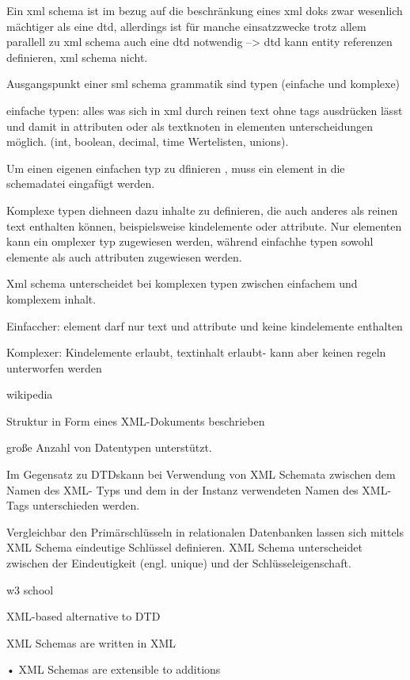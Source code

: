 Ein xml schema ist im bezug auf die beschränkung eines xml doks zwar wesenlich mächtiger als eine dtd, allerdings ist für manche einsatzzwecke trotz allem parallell zu xml schema auch eine dtd notwendig --> dtd kann entity referenzen definieren, xml schema nicht.

Ausgangspunkt einer sml schema grammatik sind typen (einfache und komplexe) 

einfache typen: alles was sich in xml durch reinen text ohne tags ausdrücken lässt und damit in attributen oder als textknoten in elementen unterscheidungen möglich. (int, boolean, decimal, time Wertelisten, unions).

Um einen eigenen einfachen typ zu dfinieren , muss ein element in die schemadatei eingafügt werden.

Komplexe typen diehneen dazu inhalte zu definieren, die auch anderes als reinen text enthalten können, beispielsweise kindelemente oder attribute. Nur elementen kann ein omplexer typ zugewiesen werden, während einfachhe typen sowohl elemente als auch attributen zugewiesen werden.

Xml schema unterscheidet bei komplexen typen zwischen einfachem und komplexem inhalt.

Einfaccher: element darf nur text und attribute und keine kindelemente enthalten

Komplexer: Kindelemente erlaubt, textinhalt erlaubt- kann aber keinen regeln unterworfen werden


wikipedia

Struktur in Form eines XML-Dokuments beschrieben

große Anzahl von Datentypen unterstützt.

Im Gegensatz zu DTDskann bei Verwendung von XML Schemata zwischen dem Namen des XML- Typs und dem in der Instanz verwendeten Namen des XML-Tags unterschieden werden.

Vergleichbar den Primärschlüsseln in relationalen Datenbanken lassen sich mittels XML Schema eindeutige Schlüssel definieren. XML Schema unterscheidet zwischen der Eindeutigkeit (engl. unique) und der Schlüsseleigenschaft.


w3 school

XML-based alternative to DTD

XML Schemas are written in XML

• XML Schemas are extensible to additions

